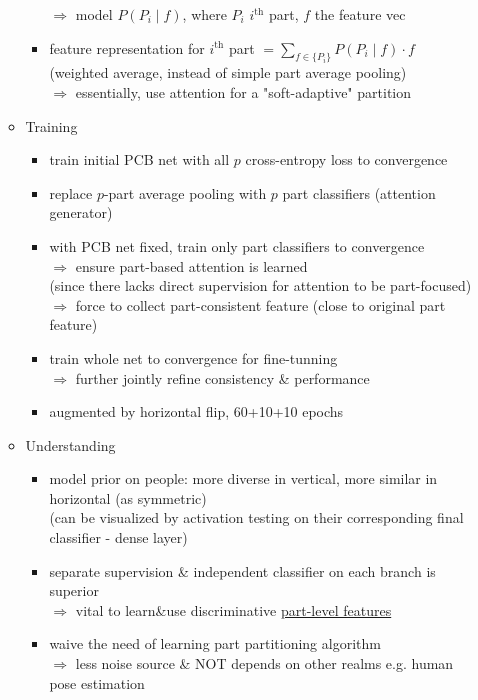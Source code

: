 \begin{itemize}
\begin{itemize}
\begin{itemize}
		$\Rightarrow$ model $P(P_i\mid f)$, where $P_i$ $i^\text{th}$ part, $f$ the feature vec
		\item feature representation for $i^\text{th}$ part $\displaystyle = \sum_{f\in\{P_i\}} P(P_i\mid f)\cdot f$ \\
		(weighted average, instead of simple part average pooling) \\
		$\Rightarrow$ essentially, use attention for a "soft-adaptive" partition
		\end{itemize}
	\item Training
		\begin{itemize}
		\item train initial PCB net with all $p$ cross-entropy loss to convergence
		\item replace $p$-part average pooling with $p$ part classifiers (attention generator)
		\item with PCB net fixed, train only part classifiers to convergence \\
		$\Rightarrow$ ensure part-based attention is learned \\
		(since there lacks direct supervision for attention to be part-focused) \\
		$\Rightarrow$ force to collect part-consistent feature (close to original part feature)
		\item train whole net to convergence for fine-tunning \\ 
		$\Rightarrow$ further jointly refine consistency \& performance
		\item augmented by horizontal flip, 60+10+10 epochs
		\end{itemize}
	\item Understanding
		\begin{itemize}
		\item model prior on people: more diverse in vertical, more similar in horizontal (as symmetric) \\
		(can be visualized by activation testing on their corresponding final classifier - dense layer)
		\item separate supervision \& independent classifier on each branch is superior \\
		$\Rightarrow$ vital to learn\&use discriminative \underline{part-level features}
		\item waive the need of learning part partitioning algorithm \\
		$\Rightarrow$ less noise source \& NOT depends on other realms e.g. human pose estimation \\

\end{itemize}
\end{itemize}
\end{itemize}

